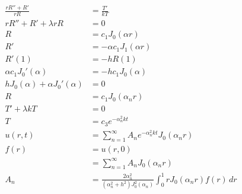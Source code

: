 \documentclass{article}
\begin{document}
\begin{align*}
  \frac{r R'' + R'}{r R}              & = \frac{T'}{k T}                                                                               \\
  r R'' + R' + \lambda r R            & = 0                                                                                            \\
  R                                   & = c_1 J_0(\alpha r)                                                                            \\
  R'                                  & = -\alpha c_1 J_1(\alpha r)                                                                    \\
  R'(1)                               & = -h R(1)                                                                                      \\
  \alpha c_1 J_0'(\alpha)             & = -h c_1 J_0(\alpha)                                                                           \\
  h J_0(\alpha) + \alpha J_0'(\alpha) & = 0                                                                                            \\
  R                                   & = c_1 J_0(\alpha_n r)                                                                          \\
  T' + \lambda k T                    & = 0                                                                                            \\
  T                                   & = c_3 e^{-\alpha_n^2 k t}                                                                      \\
  u(r, t)                             & = \sum_{n = 1}^\infty A_n e^{-\alpha_n^2 k t} J_0(\alpha_n r)                                  \\
  f(r)                                & = u(r, 0)                                                                                      \\
                                      & = \sum_{n = 1}^\infty A_n J_0(\alpha_n r)                                                      \\
  A_n                                 & = \frac{2 \alpha_n^2}{(\alpha_n^2 +h^2) J_0^2(\alpha_n)} \int_0^1 r J_0(\alpha_n r) f(r) \,d r
\end{align*}

\setcounter{subsubsection}{12}
\end{document}
